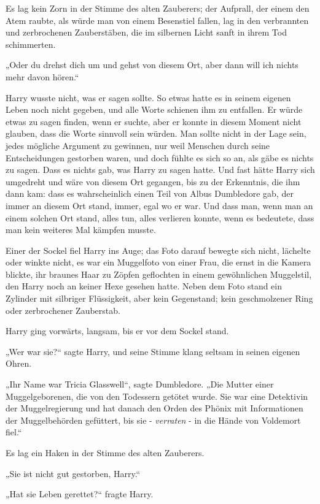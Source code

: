 {Es lag kein Zorn in der Stimme des alten Zauberers; der Aufprall, der einem den Atem raubte, als würde man von einem Besenstiel fallen, lag in den verbrannten und zerbrochenen Zauberstäben, die im silbernen Licht sanft in ihrem Tod schimmerten.

„Oder du drehst dich um und gehst von diesem Ort, aber dann will ich nichts mehr davon hören.“

Harry wusste nicht, was er sagen sollte. So etwas hatte es in seinem eigenen Leben noch nicht gegeben, und alle Worte schienen ihm zu entfallen. Er würde etwas zu sagen finden, wenn er suchte, aber er konnte in diesem Moment nicht glauben, dass die Worte sinnvoll sein würden. Man sollte nicht in der Lage sein, jedes mögliche Argument zu gewinnen, nur weil Menschen durch seine Entscheidungen gestorben waren, und doch fühlte es sich so an, als gäbe es nichts zu sagen. Dass es nichts gab, was Harry zu sagen hatte. Und fast hätte Harry sich umgedreht und wäre von diesem Ort gegangen, bis zu der Erkenntnis, die ihm dann kam: dass es wahrscheinlich einen Teil von Albus Dumbledore gab, der immer an diesem Ort stand, immer, egal wo er war. Und dass man, wenn man an einem solchen Ort stand, alles tun, alles verlieren konnte, wenn es bedeutete, dass man kein weiteres Mal kämpfen musste.

Einer der Sockel fiel Harry ins Auge; das Foto darauf bewegte sich nicht, lächelte oder winkte nicht, es war ein Muggelfoto von einer Frau, die ernst in die Kamera blickte, ihr braunes Haar zu Zöpfen geflochten in einem gewöhnlichen Muggelstil, den Harry noch an keiner Hexe gesehen hatte. Neben dem Foto stand ein Zylinder mit silbriger Flüssigkeit, aber kein Gegenstand; kein geschmolzener Ring oder zerbrochener Zauberstab.

Harry ging vorwärts, langsam, bis er vor dem Sockel stand.

„Wer war sie?“ sagte Harry, und seine Stimme klang seltsam in seinen eigenen Ohren.

„Ihr Name war Tricia Glasswell“, sagte Dumbledore. „Die Mutter einer Muggelgeborenen, die von den Todessern getötet wurde. Sie war eine Detektivin der Muggelregierung und hat danach den Orden des Phönix mit Informationen der Muggelbehörden gefüttert, bis sie - \emph{verraten} - in die Hände von Voldemort fiel.“

Es lag ein Haken in der Stimme des alten Zauberers.

„Sie ist nicht gut gestorben, Harry.“

„Hat sie Leben gerettet?“ fragte Harry.

}
